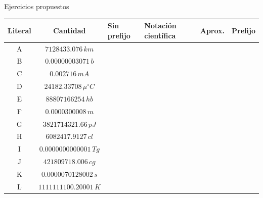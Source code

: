\begin{frame}{Ejercicios propuestos}
\footnotesize
    \begin{table}[H]
    \centering
    \begin{tabular}{|c|c|M{1cm}|M{1cm}|M{1cm}|M{1cm}|}
    \hline
        Literal & Cantidad & Sin prefijo & Notación científica & Aprox. & Prefijo  \\\hline\hline
        A & $\num{7128433.076} \,\unit{km}$ & & &  & \\\hline
        B & $\num{0.00000003071} \,\unit{b}$ & & &  & \\\hline
        C & $\num{0.002716} \,\unit{mA}$ & & &  & \\\hline
        D & $\num{24182.33708} \,\unit{\mu^\circ C}$ & & &  & \\\hline
        E & $\num{88807166254} \,\unit{hb}$ & & &  & \\\hline
        F & $\num{0.0000300008} \,\unit{m}$ & & &  & \\\hline
        G & $\num{3821714321.66} \,\unit{pJ}$ & & &  & \\\hline
        H & $\num{6082417.9127} \,\unit{cl}$ & & &  & \\\hline
        I & $\num{0.0000000000001} \,\unit{Tg}$ & & &  & \\\hline
        J & $\num{421809718.006} \,\unit{cg}$ & & &  & \\\hline
        K & $\num{0.0000070128002} \,\unit{s}$ & & &  & \\\hline
        L & $\num{1111111100.20001} \,\unit{K}$ & & &  & \\\hline
    \end{tabular}
\end{table}
\end{frame}

